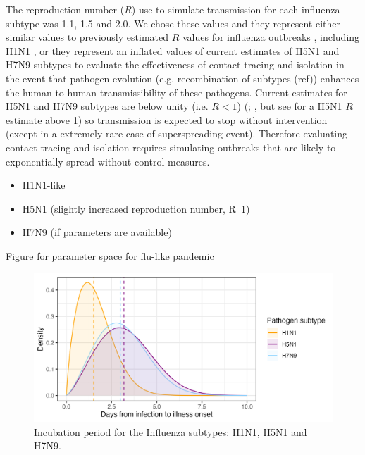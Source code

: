 \documentclass{article}
\begin{document}
The reproduction number ($R$) use to simulate transmission for each influenza subtype was 1.1, 1.5 and 2.0. We chose these values and they represent either similar values to previously estimated $R$ values for influenza outbreaks \citep{fergusonStrategiesMitigatingInfluenza2006}, including H1N1 \citep{fraserPandemicPotentialStrain2009}, or they represent an inflated values of current estimates of H5N1 and H7N9 subtypes to evaluate the effectiveness of contact tracing and isolation in the event that pathogen evolution (e.g. recombination of subtypes (ref)) enhances the human-to-human transmissibility of these pathogens. Current estimates for H5N1 and H7N9 subtypes are below unity (i.e. $R < 1$) (\citealt{tannerPandemicPotentialAvian2015}; \citealt{Ward2024.12.11.24318702}, but see \citealt{yangDetectingHumanhumanTransmission2007a} for a H5N1 $R$ estimate above 1) so transmission is expected to stop without intervention (except in a extremely rare case of superspreading event). Therefore evaluating contact tracing and isolation requires simulating outbreaks that are likely to exponentially spread without control measures.

\begin{itemize}

\item H1N1-like
\item H5N1 (slightly increased reproduction number, R~1)
\item H7N9 (if parameters are available)

\end{itemize}

Figure for parameter space for flu-like pandemic


\begin{figure}[ht]
\centering
\includegraphics[width=\textwidth]{../plots/incubation_period.png}
\caption{Incubation period for the Influenza subtypes: H1N1, H5N1 and H7N9.}
\label{fig:incub}
\end{figure}
\end{document}
